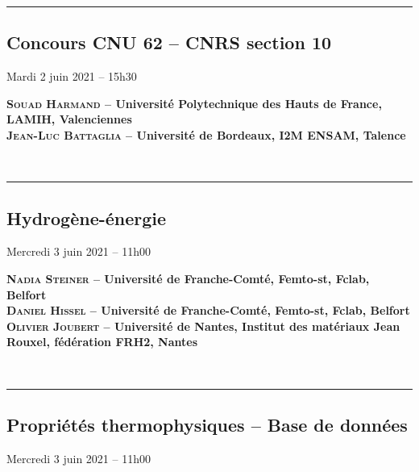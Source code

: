 \vspace{1cm}
\hrule
{}\subsection*{Concours CNU 62 – CNRS section 10}
%
\begin{center}
Mardi 2 juin 2021 -- 15h30
\end{center}


\hspace{0.04\linewidth}\vrule\hspace{0.01\linewidth}\parbox{0.9\linewidth}{
\textbf{{\scshape Souad Harmand} -- Université Polytechnique des Hauts de France, LAMIH, Valenciennes}\\
\textbf{{\scshape Jean-Luc Battaglia} -- Université de Bordeaux, I2M ENSAM, Talence}
}\\[2ex]


\vspace{1cm}
\hrule

{}\subsection*{Hydrogène-énergie}
%
\begin{center}
Mercredi 3 juin 2021 -- 11h00
\end{center}


\hspace{0.04\linewidth}\vrule\hspace{0.01\linewidth}\parbox{0.9\linewidth}{
\textbf{{\scshape Nadia Steiner} -- Université de Franche-Comté, Femto-st, Fclab, Belfort}\\
\textbf{{\scshape Daniel Hissel} -- Université de Franche-Comté, Femto-st, Fclab, Belfort}\\
\textbf{{\scshape Olivier Joubert} -- Université de Nantes, Institut des matériaux Jean Rouxel, fédération FRH2, Nantes}}\\[2ex]

\vspace{1cm}
\hrule

{}\subsection*{Propriétés thermophysiques -- Base de données}
%
\begin{center}
Mercredi 3 juin 2021 -- 11h00
\end{center}


